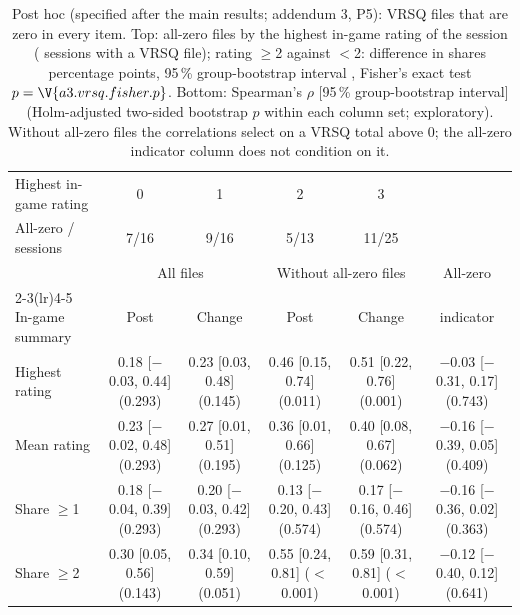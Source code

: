 \begin{table}[ht]
\centering
\footnotesize
\caption{Post hoc (specified after the main results; addendum 3, P5): VRSQ files that are zero in every item. Top: all-zero files by the highest in-game rating of the session ( sessions with a VRSQ file); rating $\geq$2 against $<$2: difference in shares  percentage points, 95\,\% group-bootstrap interval , Fisher's exact test $p=\V{a3.vrsq.fisher.p}$. Bottom: Spearman's $\rho$ [95\,\% group-bootstrap interval] (Holm-adjusted two-sided bootstrap $p$ within each column set; exploratory). Without all-zero files the correlations select on a VRSQ total above 0; the all-zero indicator column does not condition on it.}
\label{tab:a3_vrsq}
\setlength{\tabcolsep}{2pt}
\begin{tabular}{@{}lccccc@{}}
\toprule
Highest in-game rating & 0 & 1 & 2 & 3 & \\
All-zero / sessions & 7/16 & 9/16 & 5/13 & 11/25 & \\
\midrule
 & \multicolumn{2}{c}{All files} & \multicolumn{2}{c}{Without all-zero files} & All-zero \\
\cmidrule(lr){2-3}\cmidrule(lr){4-5}
In-game summary & Post & Change & Post & Change & indicator \\
\midrule
Highest rating & 0.18 [$-$0.03, 0.44] (0.293) & 0.23 [0.03, 0.48] (0.145) & 0.46 [0.15, 0.74] (0.011) & 0.51 [0.22, 0.76] (0.001) & $-$0.03 [$-$0.31, 0.17] (0.743) \\
Mean rating & 0.23 [$-$0.02, 0.48] (0.293) & 0.27 [0.01, 0.51] (0.195) & 0.36 [0.01, 0.66] (0.125) & 0.40 [0.08, 0.67] (0.062) & $-$0.16 [$-$0.39, 0.05] (0.409) \\
Share $\geq$1 & 0.18 [$-$0.04, 0.39] (0.293) & 0.20 [$-$0.03, 0.42] (0.293) & 0.13 [$-$0.20, 0.43] (0.574) & 0.17 [$-$0.16, 0.46] (0.574) & $-$0.16 [$-$0.36, 0.02] (0.363) \\
Share $\geq$2 & 0.30 [0.05, 0.56] (0.143) & 0.34 [0.10, 0.59] (0.051) & 0.55 [0.24, 0.81] ($<$0.001) & 0.59 [0.31, 0.81] ($<$0.001) & $-$0.12 [$-$0.40, 0.12] (0.641) \\
\bottomrule
\end{tabular}
\end{table}
